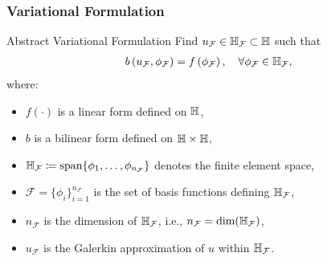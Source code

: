 \begin{frame}
\frametitle{Variational Formulation}
    \begin{block}{Abstract Variational Formulation}
        Find \( u_{\mathcal{F}} \in \mathbb{H}_{\mathcal{F}} \subset \mathbb{H} \) such that
        \begin{align}
        \label{eq:directH1}
            b\left(u_{\mathcal{F}},\phi_{\mathcal{F}}\right) = f\left(\phi_{\mathcal{F}}\right), \quad \forall \phi_{\mathcal{F}} \in \mathbb{H}_{\mathcal{F}},
        \end{align}
        where:
        \begin{itemize}
            \item $f(\cdot)$ is a linear form defined on $\mathbb{H}$,
            \item $b$ is a bilinear form defined on $\mathbb{H} \times \mathbb{H}$,
            \item $\mathbb{H}_{\mathcal{F}} \coloneqq \textrm{span}\{\phi_{1}, \dots, \phi_{n_{\mathcal{F}}}\}$ denotes the finite element space,
            \item $\mathcal{F} = \{\phi_{i}\}_{i=1}^{n_{\mathcal{F}}}$ is the set of basis functions defining $\mathbb{H}_{\mathcal{F}}$,
            \item $n_{\mathcal{F}}$ is the dimension of $\mathbb{H}_{\mathcal{F}}$, i.e., $n_{\mathcal{F}} = \textrm{dim}(\mathbb{H}_{\mathcal{F}})$,
            \item $u_{\mathcal{F}}$ is the Galerkin approximation of $u$ within $\mathbb{H}_{\mathcal{F}}$.
        \end{itemize}
    \end{block}     
\end{frame}

